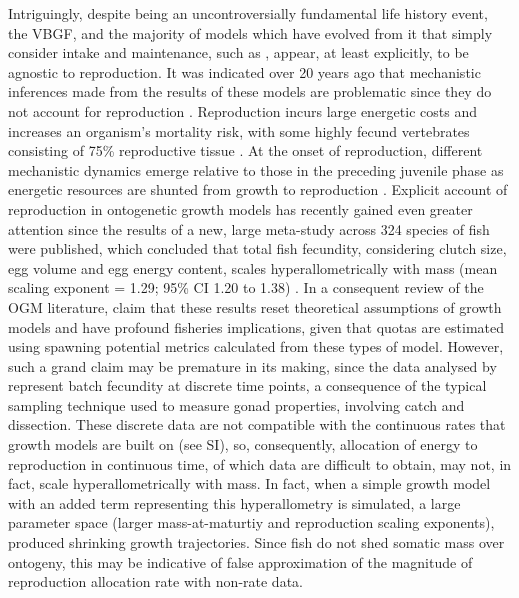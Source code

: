 \documentclass[a4paper]{article} %
\begin{document}
    Intriguingly, despite being an uncontroversially fundamental life history event, the VBGF, and the majority of models which have evolved from it that simply consider intake and maintenance, such as \cite{West2001}, appear, at least explicitly, to be agnostic to reproduction. It was indicated over 20 years ago that mechanistic inferences made from the results of these models are problematic since they do not account for reproduction \autocite{Day1997, Marshall2019b}. Reproduction incurs large energetic costs and increases an organism's mortality risk, with some highly fecund vertebrates consisting of 75\% reproductive tissue \autocite{Parker2018}. At the onset of reproduction, different mechanistic dynamics emerge relative to those in the preceding juvenile phase as energetic resources are shunted from growth to reproduction \autocite{Day1997}. Explicit account of reproduction in ontogenetic growth models has recently gained even greater attention since the results of a new, large meta-study across 324 species of fish were published, which concluded that total fish fecundity, considering clutch size, egg volume and egg energy content, scales hyperallometrically with mass (mean scaling exponent = 1.29; 95\% CI 1.20 to 1.38) \autocite{Barneche2018d}. In a consequent review of the OGM literature, \cite{Marshall2019b} claim that these results reset theoretical assumptions of growth models and have profound fisheries implications, given that quotas are estimated using spawning potential metrics calculated from these types of model. However, such a grand claim may be premature in its making, since the data analysed by \cite{Barneche2018d} represent batch fecundity at discrete time points, a consequence of the typical sampling technique used to measure gonad properties, involving catch and dissection. These discrete data are not compatible with the continuous rates that growth models are built on (see SI), so, consequently, allocation of energy to reproduction in continuous time, of which data are difficult to obtain, may not, in fact, scale hyperallometrically with mass. In fact, when a simple growth model with an added term representing this hyperallometry is simulated, a large parameter space (larger mass-at-maturtiy and reproduction scaling exponents), produced shrinking growth trajectories. Since fish do not shed somatic mass over ontogeny, this may be indicative of false approximation of the magnitude of reproduction allocation rate with non-rate data.
    
\end{document}
